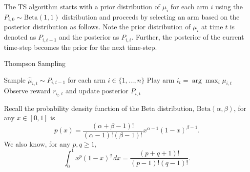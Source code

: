 \documentclass[a3paper,12pt]{extarticle} %
\begin{document}
The TS algorithm starts with a prior distribution of $\mu_i$ for each arm $i$ using the $P_{i,0} \sim \text{Beta}(1, 1)$ distribution and proceeds by selecting an arm based on the posterior distribution as follows. Note the prior distribution of $\mu_i$ at time $t$ is denoted as $P_{i,t-1}$ and the posterior as $P_{i,t}$. Further, the posterior of the current time-step becomes the prior for the next time-step.

\begin{algorithm}
\caption{Thompson Sampling}
\begin{algorithmic}[1]
    \State Sample $\hat{\mu}_{i,t} \sim P_{i,t-1}$ for each arm $i \in \{1, \ldots, n\}$
    \State Play arm $i_t = \arg \max_i \hat{\mu}_{i,t}$
    \State Observe reward $r_{i_t,t}$ and update posterior $P_{i,t}$
\EndFor
\end{algorithmic}
\end{algorithm}
Recall the probability density function of the Beta distribution, $\text{Beta}(\alpha, \beta)$, for any $x \in [0, 1]$ is
\[
p(x) = \frac{(\alpha + \beta - 1)!}{(\alpha - 1)!(\beta - 1)!} x^{\alpha - 1} (1 - x)^{\beta - 1}.
\]
We also know, for any $p, q \geq 1$,
\[
\int_0^1 x^p (1 - x)^q \, dx = \frac{(p + q + 1)!}{(p - 1)!(q - 1)!}.
\]
\end{document}
